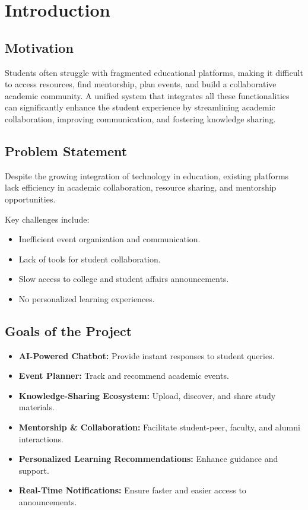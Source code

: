 \chapter{Introduction}

\section{Motivation}

Students often struggle with fragmented educational platforms, making it difficult to access resources, find mentorship, plan events, and build a collaborative academic community. A unified system that integrates all these functionalities can significantly enhance the student experience by streamlining academic collaboration, improving communication, and fostering knowledge sharing.

\section{Problem Statement}

Despite the growing integration of technology in education, existing platforms lack efficiency in academic collaboration, resource sharing, and mentorship opportunities.

Key challenges include:
\begin{itemize}
    \item Inefficient event organization and communication.
    \item Lack of tools for student collaboration.
    \item Slow access to college and student affairs announcements.
    \item No personalized learning experiences.
\end{itemize}

\section{Goals of the Project}

\begin{itemize}
    \item \textbf{AI-Powered Chatbot:} Provide instant responses to student queries.
    \item \textbf{Event Planner:} Track and recommend academic events.
    \item \textbf{Knowledge-Sharing Ecosystem:} Upload, discover, and share study materials.
    \item \textbf{Mentorship \& Collaboration:} Facilitate student-peer, faculty, and alumni interactions.
    \item \textbf{Personalized Learning Recommendations:} Enhance guidance and support.
    \item \textbf{Real-Time Notifications:} Ensure faster and easier access to announcements.
\end{itemize}

